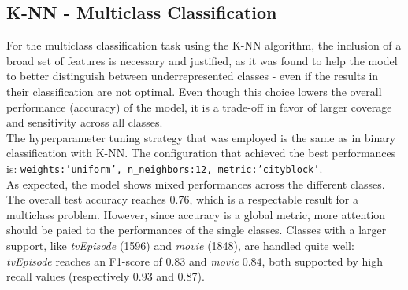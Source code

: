 \subsection{K-NN - Multiclass Classification}
For the multiclass classification task using the K-NN algorithm, the inclusion of a broad set of 
features is necessary and justified, as it was found to help the model to better distinguish between 
underrepresented classes - even if the results in their classification are not optimal. 
Even though this choice lowers the overall performance (accuracy) of the model, 
it is a trade-off in favor of larger coverage and sensitivity across all classes.\\
The hyperparameter tuning strategy that was employed is the same as in binary classification with K-NN. 
The configuration that achieved the best performances is: \texttt{{weights:'uniform', n\_neighbors:12, metric:'cityblock'}}.\\ 
As expected, the model shows mixed performances across the different classes. 
The overall test accuracy reaches 0.76, which is a respectable result for a multiclass problem. 
However, since accuracy is a global metric, more attention should be paied to the performances of the single classes. 
Classes with a larger support, like \textit{tvEpisode} (1596) and \textit{movie} (1848), are handled quite well: \textit{tvEpisode} reaches an F1-score of 0.83 and \textit{movie} 0.84, both supported by high recall values (respectively 0.93 and 0.87). 
